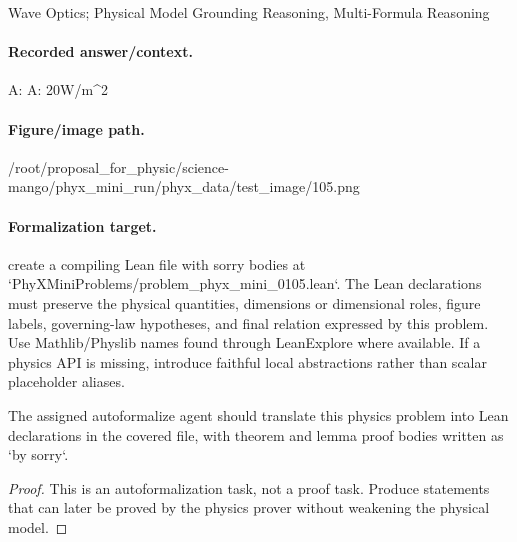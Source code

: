 Wave Optics; Physical Model Grounding Reasoning, Multi-Formula Reasoning

\paragraph{Recorded answer/context.}
A: A: 20W/m\textasciicircum{}2

\paragraph{Figure/image path.}
/root/proposal\_for\_physic/science-mango/phyx\_mini\_run/phyx\_data/test\_image/105.png

\paragraph{Formalization target.}
create a compiling Lean file with sorry bodies at `PhyXMiniProblems/problem\_phyx\_mini\_0105.lean`. The Lean declarations must preserve the physical quantities, dimensions or dimensional roles, figure labels, governing-law hypotheses, and final relation expressed by this problem.
Use Mathlib/Physlib names found through LeanExplore where available. If a physics API is missing, introduce faithful local abstractions rather than scalar placeholder aliases.

\begin{theorem}
\label{thm:physics:phyx_mini_0105:target}
The assigned autoformalize agent should translate this physics problem into Lean declarations in the covered file, with theorem and lemma proof bodies written as `by sorry`.
\end{theorem}
\begin{proof}
This is an autoformalization task, not a proof task. Produce statements that can later be proved by the physics prover without weakening the physical model.
\end{proof}

